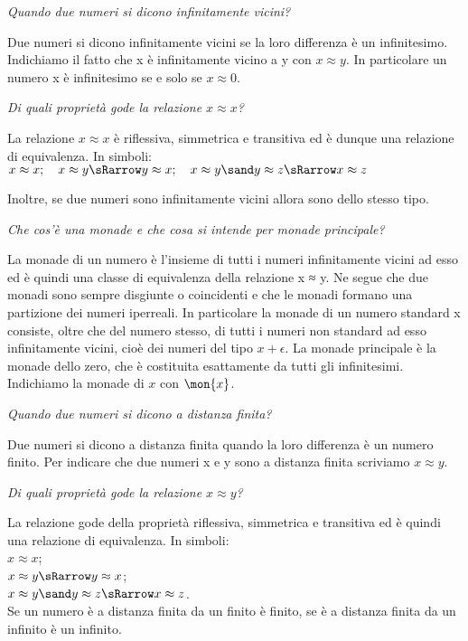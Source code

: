 \begin{esercizio}\label{ese:iper_018} 
\emph{Quando due numeri si dicono infinitamente vicini?}

Due numeri si dicono infinitamente vicini se la loro differenza è un 
infinitesimo. Indichiamo il fatto che x è infinitamente vicino a y con 
\(x \approx y\). 
In particolare un numero x è infinitesimo se e solo se \(x \approx 0\).
\end{esercizio}

\begin{esercizio}\label{ese:iper_019} 
\emph{Di quali proprietà gode la relazione \(x \approx x\)?}

La relazione \(x \approx x\) è riflessiva, simmetrica e transitiva ed è 
dunque una relazione di equivalenza. In simboli:\\
\(x \approx x; \quad 
  x \approx y \sRarrow y \approx x; \quad
  x \approx y \sand y \approx z \sRarrow x \approx z\)
  
Inoltre, se due numeri sono infinitamente vicini allora sono dello stesso 
tipo.
\end{esercizio}

\begin{esercizio}\label{ese:iper_020} 
\emph{Che cos'è una monade e che cosa si intende per monade principale?}

La monade di un numero è l'insieme di tutti i numeri infinitamente vicini 
ad esso ed è quindi una classe di equivalenza della relazione x ≈ y. Ne 
segue che due monadi sono sempre disgiunte o coincidenti e che le monadi 
formano una partizione dei numeri iperreali. 
In particolare la monade di un numero standard x consiste, oltre che del 
numero stesso, di tutti i numeri non standard ad esso infinitamente vicini, 
cioè dei numeri del tipo \(x + \epsilon\). 
La monade principale è la monade dello zero, che è costituita esattamente da 
tutti gli infinitesimi. Indichiamo la monade di \(x\) con \(\mon{x}\).
\end{esercizio}

\begin{esercizio}\label{ese:iper_021} 
\emph{Quando due numeri si dicono a distanza finita?}

Due numeri si dicono a distanza finita quando la loro differenza è un 
numero finito. 
Per indicare che due numeri x e y sono a distanza finita scriviamo 
\(x \approx y\).
\end{esercizio}

\begin{esercizio}\label{ese:iper_022} 
\emph{Di quali proprietà gode la relazione \(x \approx y\)?}

La relazione gode della proprietà riflessiva, simmetrica e transitiva ed è 
quindi una relazione di equivalenza. In simboli:\\
\(x \approx x\);\\
\(x \approx y \sRarrow y \approx x\);\\
\(x \approx y \sand y \approx z \sRarrow x \approx z\).\\
Se un numero è a distanza finita da un finito è finito, se è a distanza 
finita da un infinito è un infinito.
\end{esercizio}

